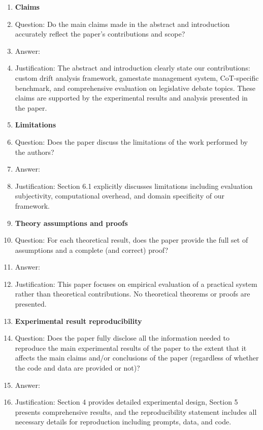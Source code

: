 \documentclass[11pt]{article}
\begin{document}
\begin{enumerate}

\item {\bf Claims}
    \item[] Question: Do the main claims made in the abstract and introduction accurately reflect the paper's contributions and scope?
    \item[] Answer: \answerYes{} 
    \item[] Justification: The abstract and introduction clearly state our contributions: custom drift analysis framework, gamestate management system, CoT-specific benchmark, and comprehensive evaluation on legislative debate topics. These claims are supported by the experimental results and analysis presented in the paper.
    
\item {\bf Limitations}
    \item[] Question: Does the paper discuss the limitations of the work performed by the authors?
    \item[] Answer: \answerYes{} 
    \item[] Justification: Section 6.1 explicitly discusses limitations including evaluation subjectivity, computational overhead, and domain specificity of our framework.
    
\item {\bf Theory assumptions and proofs}
    \item[] Question: For each theoretical result, does the paper provide the full set of assumptions and a complete (and correct) proof?
    \item[] Answer: \answerNA{} 
    \item[] Justification: This paper focuses on empirical evaluation of a practical system rather than theoretical contributions. No theoretical theorems or proofs are presented.
    
\item {\bf Experimental result reproducibility}
    \item[] Question: Does the paper fully disclose all the information needed to reproduce the main experimental results of the paper to the extent that it affects the main claims and/or conclusions of the paper (regardless of whether the code and data are provided or not)?
    \item[] Answer: \answerYes{} 
    \item[] Justification: Section 4 provides detailed experimental design, Section 5 presents comprehensive results, and the reproducibility statement includes all necessary details for reproduction including prompts, data, and code.
    

\end{enumerate}
\end{document}
